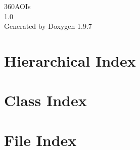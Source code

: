 \documentclass[twoside]{book}
\newcommand{\+}{\discretionary{\mbox{\scriptsize$\hookleftarrow$}}{}{}}
\newcommand{\clearemptydoublepage}{%
    \newpage{\pagestyle{empty}\cleardoublepage}%
  }
\begin{document}
  \raggedbottom
    \hypersetup{pageanchor=false,
                bookmarksnumbered=true,
                pdfencoding=unicode
               }
  \begin{titlepage}
  \vspace*{7cm}
  \begin{center}%
  {\Large 360\+AOIs}\\
  [1ex]\large 1.\+0 \\
  \vspace*{1cm}
  {\large Generated by Doxygen 1.9.7}\\
  \end{center}
  \end{titlepage}
  \clearemptydoublepage
  \tableofcontents
  \clearemptydoublepage
  \hypersetup{pageanchor=true}

\chapter{Hierarchical Index}

\chapter{Class Index}

\chapter{File Index}

\end{document}

